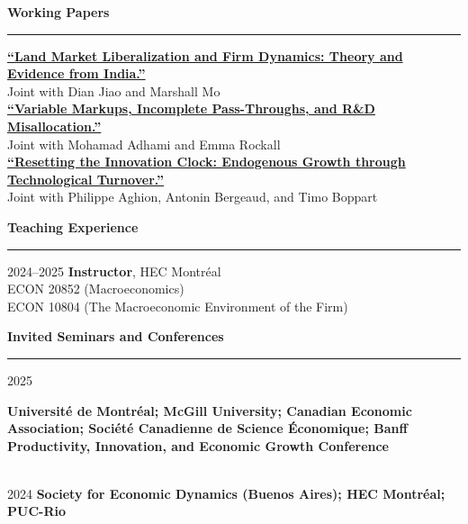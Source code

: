 \documentclass[12pt]{article}
\begin{document}
\vspace{0.5cm}

{\large \textbf{Working Papers}} \\
\noindent\rule[0.5\baselineskip]{\textwidth}{1pt}

\begin{small}
\href{https://drive.google.com/file/d/1z8lTR8R5P9uCwSs1FLgQa9mQ6WbSRwEo/view}{\textbf{``Land Market Liberalization and Firm Dynamics: Theory and Evidence from India.''}} \\
Joint with Dian Jiao and Marshall Mo \\[-0.5\baselineskip]

\href{https://jfbrou.github.io/papers/markups.pdf}{\textbf{``Variable Markups, Incomplete Pass-Throughs, and R\&D Misallocation.''}} \\
Joint with Mohamad Adhami and Emma Rockall \\[-0.5\baselineskip]

\href{https://jfbrou.github.io/papers/ABBB_2025.pdf}{\textbf{``Resetting the Innovation Clock: Endogenous Growth through Technological Turnover.''}} \\
Joint with Philippe Aghion, Antonin Bergeaud, and Timo Boppart
\end{small}

\clearpage

{\large \textbf{Teaching Experience}} \\
\noindent\rule[0.5\baselineskip]{\textwidth}{1pt}

\begin{small}
2024--2025 \tabto{3cm} \textbf{Instructor}, HEC Montr\'eal \\
\tabto{3cm} \hspace{0.25cm} ECON 20852 (Macroeconomics) \\
\tabto{3cm} \hspace{0.25cm} ECON 10804 (The Macroeconomic Environment of the Firm)
\end{small}

\vspace{0.5cm}

{\large \textbf{Invited Seminars and Conferences}} \\
\noindent\rule[0.5\baselineskip]{\textwidth}{1pt}

\begin{small}

2025 \tabto{3cm} \parbox[t]{13cm}{\textbf{Université de Montréal; McGill University; Canadian Economic Association; Société Canadienne de Science \'Economique; Banff Productivity, Innovation, and Economic Growth Conference}} \\

2024 \tabto{3cm} \textbf{Society for Economic
Dynamics (Buenos Aires); HEC Montr\'eal; PUC-Rio}

\end{small}
\end{document}
